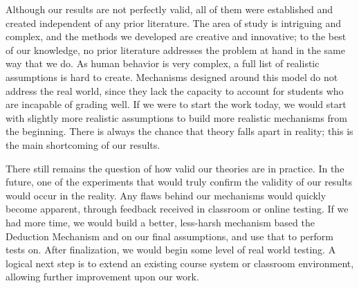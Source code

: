 \documentclass[12pt, Arial]{article}
\begin{document}
Although our results are not perfectly valid, all of them were established and created independent of any prior literature. The area of study is intriguing and complex, and the methods we developed are creative and innovative; to the best of our knowledge, no prior literature addresses the problem at hand in the same way that we do. As human behavior is very complex, a full list of realistic assumptions is hard to create. Mechanisms designed around this model do not address the real world, since they lack the capacity to account for students who are incapable of grading well. If we were to start the work today, we would start with slightly more realistic assumptions to build more realistic mechanisms from the beginning. There is always the chance that theory falls apart in reality; this is the main shortcoming of our results. 

There still remains the question of how valid our theories are in practice. In the future, one of the experiments that would truly confirm the validity of our results would occur in the reality. Any flaws behind our mechanisms would quickly become apparent, through feedback received in classroom or online testing. If we had more time, we would build a better, less-harsh mechanism based the Deduction Mechanism and on our final assumptions, and use that to perform tests on. After finalization, we would begin some level of real world testing. A logical next step is to extend an existing course system or classroom environment, allowing further improvement upon our work.

\newpage
{}

\end{document}
